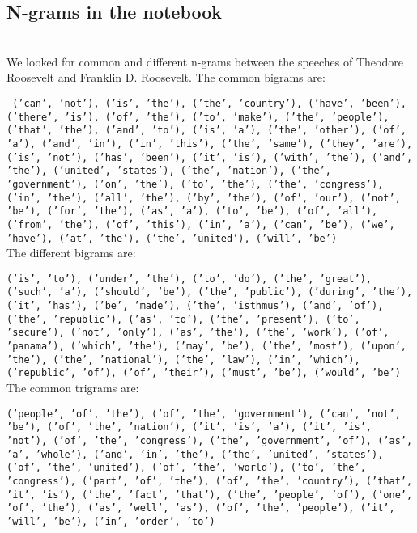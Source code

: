 \documentclass[a4paper, 11pt]{article}
\begin{document}
\subsection{N-grams in the notebook}

\noindent{}\\

We looked for common and different n-grams between the speeches of Theodore Roosevelt and Franklin D. Roosevelt. The common bigrams are:

\texttt{ ('can', 'not'), ('is', 'the'), ('the', 'country'), ('have', 'been'), ('there', 'is'), ('of', 'the'), ('to', 'make'), ('the', 'people'), ('that', 'the'), ('and', 'to'), ('is', 'a'), ('the', 'other'), ('of', 'a'), ('and', 'in'), ('in', 'this'), ('the', 'same'), ('they', 'are'), ('is', 'not'), ('has', 'been'), ('it', 'is'), ('with', 'the'), ('and', 'the'), ('united', 'states'), ('the', 'nation'), ('the', 'government'), ('on', 'the'), ('to', 'the'), ('the', 'congress'), ('in', 'the'), ('all', 'the'), ('by', 'the'), ('of', 'our'), ('not', 'be'), ('for', 'the'), ('as', 'a'), ('to', 'be'), ('of', 'all'), ('from', 'the'), ('of', 'this'), ('in', 'a'), ('can', 'be'), ('we', 'have'), ('at', 'the'), ('the', 'united'), ('will', 'be')}\\

The different bigrams are:

\texttt{('is', 'to'), ('under', 'the'), ('to', 'do'), ('the', 'great'), ('such', 'a'), ('should', 'be'), ('the', 'public'), ('during', 'the'), ('it', 'has'), ('be', 'made'), ('the', 'isthmus'), ('and', 'of'), ('the', 'republic'), ('as', 'to'), ('the', 'present'), ('to', 'secure'), ('not', 'only'), ('as', 'the'), ('the', 'work'), ('of', 'panama'), ('which', 'the'), ('may', 'be'), ('the', 'most'), ('upon', 'the'), ('the', 'national'), ('the', 'law'), ('in', 'which'), ('republic', 'of'), ('of', 'their'), ('must', 'be'), ('would', 'be')}\\
 
The common trigrams are:

\texttt{('people', 'of', 'the'), ('of', 'the', 'government'), ('can', 'not', 'be'), ('of', 'the', 'nation'), ('it', 'is', 'a'), ('it', 'is', 'not'), ('of', 'the', 'congress'), ('the', 'government', 'of'), ('as', 'a', 'whole'), ('and', 'in', 'the'), ('the', 'united', 'states'), ('of', 'the', 'united'), ('of', 'the', 'world'), ('to', 'the', 'congress'), ('part', 'of', 'the'), ('of', 'the', 'country'), ('that', 'it', 'is'), ('the', 'fact', 'that'), ('the', 'people', 'of'), ('one', 'of', 'the'), ('as', 'well', 'as'), ('of', 'the', 'people'), ('it', 'will', 'be'), ('in', 'order', 'to')}\\
\end{document}
